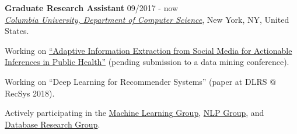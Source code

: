 \documentclass[letterpaper]{article}
\renewenvironment{itemize}{
  \begin{list}{}{
    \setlength{\leftmargin}{1.5em}
  }
}{
  \end{list}
}
\begin{document}
\begin{itemize}

\item 
    \textbf{Graduate Research Assistant} \hfill 09/2017 - now\\ 
    \href{https://www.cs.columbia.edu/}{\it Columbia University, Department of Computer Science}, New York, NY, United States.
    \begin{itemize}
        \item Working on \href{http://publichealth.cs.columbia.edu/}{``Adaptive Information Extraction from Social Media for Actionable Inferences in Public Health''} (pending submission to a data mining conference).
        \item Working on ``Deep Learning for Recommender Systems'' (paper at DLRS @ RecSys 2018). 
        \item Actively participating in the \href{http://www.cs.columbia.edu/areas/machine/}{Machine Learning Group}, \href{http://www.cs.columbia.edu/nlp/index.cgi}{NLP Group}, and \href{https://cudbg.github.io/}{Database Research Group}.
    \end{itemize}  
    

\end{itemize}
\end{document}

